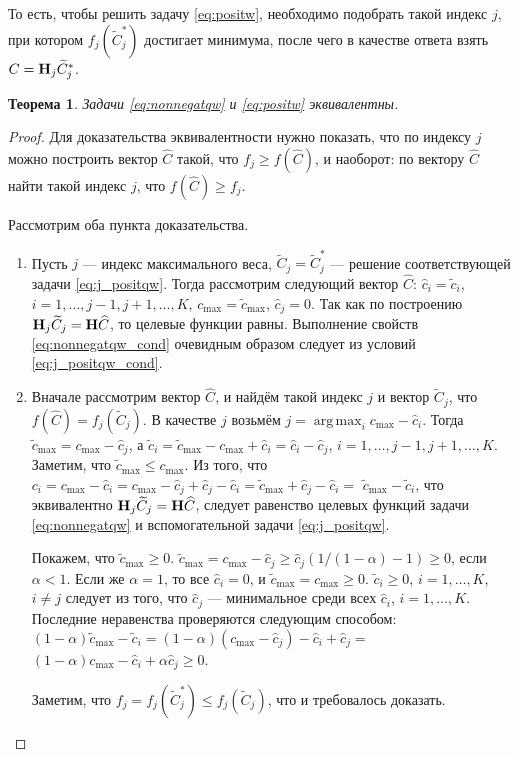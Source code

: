 \documentclass[12pt,a4paper]{article}
\DeclareMathOperator*{\argmax}{arg\,max}
\newtheorem{theorem}{Теорема}
\begin{document}
То есть, чтобы решить задачу \ref{eq:positw}, необходимо подобрать такой индекс $j$, при котором $f_j(\widetilde C_j^*)$ достигает минимума, после чего в качестве ответа взять $C = \mathbf{H}_j \widetilde C_j^*$.
\begin{theorem} \label{th:eqivqw}
	Задачи \eqref{eq:nonnegatqw} и \eqref{eq:positw} эквивалентны.
\end{theorem}
\begin{proof}
	Для доказательства эквивалентности нужно показать, что по индексу $j$ можно построить вектор $\widehat C$ такой, что $f_j \ge f(\widehat C)$, и наоборот: по вектору $\widehat C$ найти такой индекс $j$, что $f(\widehat C) \ge f_j$.
	
	Рассмотрим оба пункта доказательства.
	\begin{enumerate}
		\item Пусть $j$ --- индекс максимального веса, $\widetilde C_j = \widetilde C_j^*$ --- решение соответствующей задачи \eqref{eq:j_positqw}. Тогда рассмотрим следующий вектор $\widehat C$: $\hat c_i = \tilde c_i$, $i = 1, \ldots, j-1, j+1, \ldots, K$, $c_\text{max} = \tilde c_\text{max}$, $\hat c_j = 0$. Так как по построению $\mathbf{H}_j \widetilde C_j = \mathbf{H} \widehat C$, то целевые функции равны. Выполнение свойств \eqref{eq:nonnegatqw_cond} очевидным образом следует из условий \eqref{eq:j_positqw_cond}.
		\item Вначале рассмотрим вектор $\widehat C$, и найдём такой индекс $j$ и вектор $\widetilde C_j$, что $f(\widehat C) = f_j(\widetilde C_j)$. В качестве $j$ возьмём $j = \argmax_i c_\text{max} - \hat c_i$. Тогда $\tilde c_\text{max} = c_\text{max} - \hat c_j$, а $\tilde c_i = \tilde c_\text{max} - c_\text{max} + \hat c_i = \hat c_i - \hat c_j$, $i = 1, \ldots, j-1, j+1, \ldots, K$. Заметим, что $\tilde c_\text{max} \le c_\text{max}$. Из того, что $c_i = c_\text{max} - \hat c_i = c_\text{max} - \hat c_j + \hat c_j - \hat c_i = \tilde c_\text{max} + \hat c_j - \hat c_i =$ $\tilde c_\text{max} - \tilde c_i$, что эквивалентно $\mathbf{H}_j \widetilde C_j = \mathbf{H} \widehat C$, следует равенство целевых функций задачи \eqref{eq:nonnegatqw} и вспомогательной задачи \eqref{eq:j_positqw}.
		
		Покажем, что $\tilde c_\text{max} \ge 0$. $\tilde c_\text{max} = c_\text{max} - \hat c_j \ge \hat c_j (1/(1 - \alpha) - 1) \ge 0$, если $\alpha < 1$. Если же $\alpha = 1$, то все $\hat c_i = 0$, и $\tilde c_\text{max} = c_\text{max} \ge 0$. $\tilde c_i \ge 0$, $i = 1, \ldots, K$, $i \neq j$ следует из того, что $\hat c_j$ --- минимальное среди всех $\hat c_i$, $i = 1, \ldots, K$. Последние неравенства проверяются следующим способом: $(1 - \alpha) \tilde c_\text{max} - \tilde c_i = (1 - \alpha)(c_\text{max} - \hat c_j) - \hat c_i + \hat c_j = $ $(1 - \alpha)c_\text{max} - \hat c_i + \alpha \hat c_j \ge 0$.
		
		Заметим, что $f_j = f_j(\widetilde C_j^*) \le f_j(\widetilde C_j)$, что и требовалось доказать.
	\end{enumerate}
\end{proof}
\end{document}
